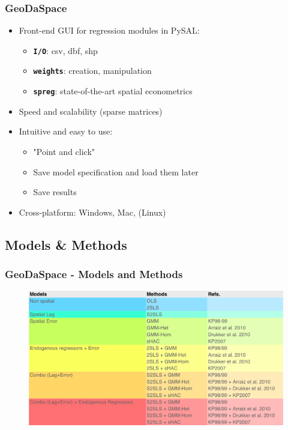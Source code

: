 \documentclass[nototal]{beamer}
\begin{document}
\begin{frame}
	\frametitle{GeoDaSpace}
 \begin{itemize}
 \item  Front-end GUI for regression modules in PySAL:
 \begin{itemize}
 \item  \texttt{\textbf{I/O}}: csv, dbf, shp
 \item  \texttt{\textbf{weights}}: creation, manipulation
 \item  \texttt{\textbf{spreg}}: state-of-the-art spatial econometrics
 \end{itemize}
 \item  Speed and scalability (sparse matrices)
 \item  Intuitive and easy to use:
 \begin{itemize}
 \item  "Point and click"
 \item  Save model specification and load them later
 \item  Save results
 \end{itemize}
 \item  Cross-platform: Windows, Mac, (Linux)
 \end{itemize}
 \end{frame} 

\subsection{Models \& Methods} 

\begin{frame}
	\frametitle{GeoDaSpace - Models and Methods}
  \begin{figure}
  \includegraphics[width=1\linewidth]{figs/models.png}
  \end{figure}
 \end{frame} 
\end{document}
